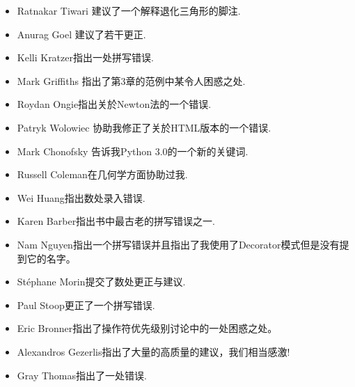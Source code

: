 \begin{itemize}
\item Ratnakar Tiwari 建议了一个解释退化三角形的脚注.

\item Anurag Goel 建议了若干更正.

\item Kelli Kratzer指出一处拼写错误.

\item Mark Griffiths 指出了第3章的范例中某令人困惑之处.

\item Roydan Ongie指出关於Newton法的一个错误.

\item Patryk Wolowiec 协助我修正了关於HTML版本的一个错误.

\item Mark Chonofsky 告诉我Python 3.0的一个新的关键词.

\item Russell Coleman在几何学方面协助过我.

\item Wei Huang指出数处录入错误.

\item Karen Barber指出书中最古老的拼写错误之一.

\item Nam Nguyen指出一个拼写错误并且指出了我使用了Decorator模式但是没有提到它的名字。

\item St\'{e}phane Morin提交了数处更正与建议.

\item Paul Stoop更正了一个拼写错误.

\item Eric Bronner指出了操作符优先级别讨论中的一处困惑之处。

\item Alexandros Gezerlis指出了大量的高质量的建议，我们相当感激!

\item Gray Thomas指出了一处错误.


\end{itemize}


\normalsize
\clearemptydoublepage

\begin{latexonly}

\tableofcontents

\clearemptydoublepage

\end{latexonly}
